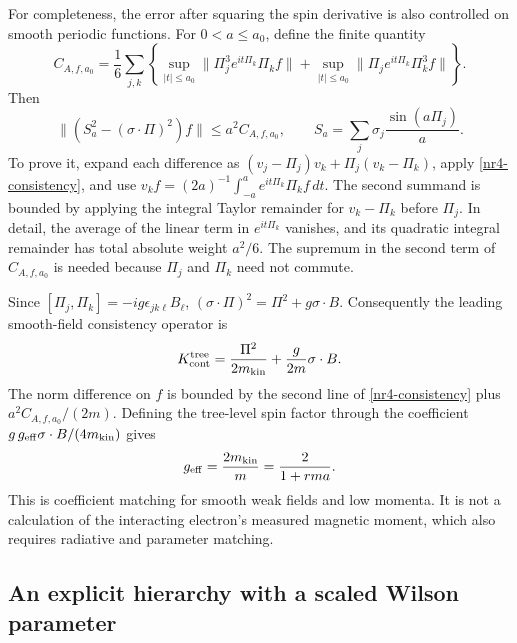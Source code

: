 For completeness, the error after squaring the spin derivative is also
controlled on smooth periodic functions. For $0<a\le a_0$, define the finite
quantity
\[
 C_{A,f,a_0}=\frac16\sum_{j,k}
 \left\{\sup_{|t|\le a_0}\|\Pi_j^3e^{it\Pi_k}\Pi_kf\|
       +\sup_{|t|\le a_0}\|\Pi_j e^{it\Pi_k}\Pi_k^3f\|\right\}.
\]
Then
\begin{equation}
 \|(S_a^2-(\sigma\cdot\Pi)^2)f\|\le a^2C_{A,f,a_0},
 \qquad S_a=\sum_j\sigma_j\frac{\sin(a\Pi_j)}a.
 \label{nr4-squared-consistency}
\end{equation}
To prove it, expand each difference as
$(v_j-\Pi_j)v_k+\Pi_j(v_k-\Pi_k)$, apply
\eqref{nr4-consistency}, and use
$v_kf=(2a)^{-1}\int_{-a}^ae^{it\Pi_k}\Pi_kf\,dt$.
The second summand is bounded by applying the integral Taylor remainder
for $v_k-\Pi_k$ before $\Pi_j$. In detail, the average of the linear
term in $e^{it\Pi_k}$ vanishes, and its quadratic integral remainder
has total absolute weight $a^2/6$. The supremum in the second term
of $C_{A,f,a_0}$ is needed because $\Pi_j$ and $\Pi_k$ need not commute.

Since $[\Pi_j,\Pi_k]=-ig\epsilon_{jk\ell}B_\ell$,
$(\sigma\cdot\Pi)^2=\Pi^2+g\sigma\cdot B$. Consequently the leading
smooth-field consistency operator is
\begin{equation}
 K_{\rm cont}^{\rm tree}
 =\frac{\Pi^2}{2m_{\rm kin}}+\frac{g}{2m}\sigma\cdot B.
 \label{nr4-tree-pauli}
\end{equation}
The norm difference on $f$ is bounded by the second line of
\eqref{nr4-consistency} plus $a^2C_{A,f,a_0}/(2m)$.
Defining the tree-level spin factor through the coefficient
$g\,g_{\rm eff}\sigma\cdot B/(4m_{\rm kin})$ gives
\begin{equation}
 g_{\rm eff}=\frac{2m_{\rm kin}}m=\frac2{1+rma}.
 \label{nr4-g-factor}
\end{equation}
This is coefficient matching for smooth weak fields and low momenta.
It is not a calculation of the interacting electron's measured magnetic
moment, which also requires radiative and parameter matching.

\subsection{An explicit hierarchy with a scaled Wilson parameter}
\label{nr4-scaled}

